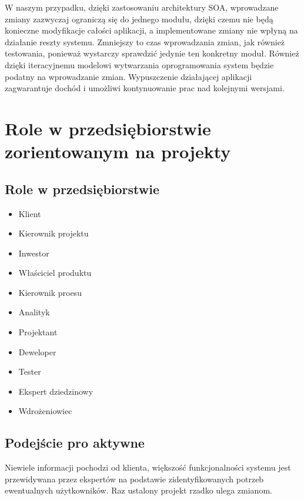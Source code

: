 	W naszym przypadku, dzięki zastosowaniu architektury SOA, wprowadzane zmiany zazwyczaj ograniczą się do jednego modułu, dzięki czemu nie będą konieczne modyfikacje całości aplikacji, a implementowane zmiany nie wpłyną na działanie reszty systemu. Zmniejszy to czas wprowadzania zmian, jak również testowania, ponieważ wystarczy sprawdzić jedynie ten konkretny moduł. Również dzięki iteracyjnemu modelowi wytwarzania oprogramowania system będzie podatny na wprowadzanie zmian. Wypuszczenie działającej aplikacji zagwarantuje dochód i umożliwi kontynuowanie prac nad kolejnymi wersjami.



\section{Role w przedsiębiorstwie zorientowanym na projekty}

\subsection*{Role w przedsiębiorstwie}
\begin{itemize}
\item Klient
\item Kierownik projektu
\item Inwestor
\item Właściciel produktu
\item Kierownik proesu
\item Analityk
\item Projektant
\item Deweloper
\item Tester
\item Ekspert dziedzinowy
\item Wdrożeniowiec
\end{itemize}

\subsection*{Podejście pro aktywne}
Niewiele informacji pochodzi od klienta, większość funkcjonalności systemu jest przewidywana przez ekspertów na podstawie zidentyfikowanych potrzeb ewentualnych użytkowników. Raz ustalony projekt rzadko ulega zmianom.

